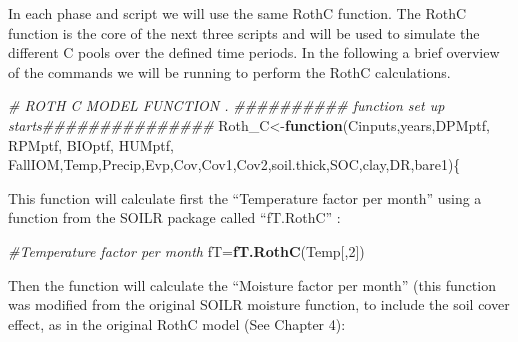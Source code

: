 \documentclass[
  10pt,
  b5paper,
]{book}
\newenvironment{Shaded}{\begin{snugshade}}{\end{snugshade}}
\newcommand{\CommentTok}[1]{\textcolor[rgb]{0.56,0.35,0.01}{\textit{#1}}}
\newcommand{\ControlFlowTok}[1]{\textcolor[rgb]{0.13,0.29,0.53}{\textbf{#1}}}
\newcommand{\DecValTok}[1]{\textcolor[rgb]{0.00,0.00,0.81}{#1}}
\newcommand{\KeywordTok}[1]{\textcolor[rgb]{0.13,0.29,0.53}{\textbf{#1}}}
\newcommand{\NormalTok}[1]{#1}
\begin{document}
In each phase and script we will use the same RothC function. The RothC function is the core of the next three scripts and will be used to simulate the different C pools over the defined time periods. In the following a brief overview of the commands we will be running to perform the RothC calculations.

\begin{Shaded}
\begin{Highlighting}[]
\CommentTok{# ROTH C MODEL FUNCTION .}
\CommentTok{########## function set up starts############### }
\NormalTok{Roth_C<-}\ControlFlowTok{function}\NormalTok{(Cinputs,years,DPMptf, RPMptf, BIOptf, HUMptf, FallIOM,Temp,Precip,Evp,Cov,Cov1,Cov2,soil.thick,SOC,clay,DR,bare1)\{}
\end{Highlighting}
\end{Shaded}

This function will calculate first the ``Temperature factor per month'' using a function from the SOILR package called ``fT.RothC'' :

\begin{Shaded}
\begin{Highlighting}[]
\CommentTok{#Temperature factor per month}
\NormalTok{fT=}\KeywordTok{fT.RothC}\NormalTok{(Temp[,}\DecValTok{2}\NormalTok{]) }
\end{Highlighting}
\end{Shaded}

Then the function will calculate the ``Moisture factor per month'' (this function was modified from the original SOILR moisture function, to include the soil cover effect, as in the original RothC model (See Chapter 4):
\end{document}
